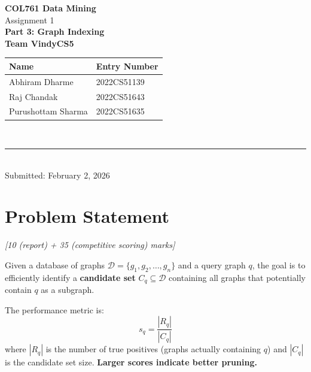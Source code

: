 \documentclass[12pt,a4paper]{article}
\begin{document}
\begin{titlepage}
    \centering
    \vspace*{1cm}
    {\Huge\bfseries\color{indigoblue} COL761 Data Mining}\\[0.5cm]
    {\LARGE Assignment 1}\\[0.3cm]
    {\Large\textbf{Part 3: Graph Indexing}}\\[2cm]
    
    {\LARGE\bfseries Team VindyCS5}\\[0.5cm]
    
    \begin{tabular}{ll}
        \toprule
        \textbf{Name} & \textbf{Entry Number} \\
        \midrule
        Abhiram Dharme & 2022CS51139 \\
        Raj Chandak & 2022CS51643 \\
        Purushottam Sharma & 2022CS51635 \\
        \bottomrule
    \end{tabular}\\[1cm]
    
    \rule{\textwidth}{0.5pt}\\[0.3cm]
    {\large Submitted: February 2, 2026}
    \vfill
\end{titlepage}

\tableofcontents
\newpage

\section{Problem Statement}
\textit{[10 (report) + 35 (competitive scoring) marks]}

Given a database of graphs $\mathcal{D} = \{g_1, g_2, \ldots, g_n\}$ and a query graph $q$, the goal is to efficiently identify a \textbf{candidate set} $C_q \subseteq \mathcal{D}$ containing all graphs that potentially contain $q$ as a subgraph.

The performance metric is:
\[
s_q = \frac{|R_q|}{|C_q|}
\]
where $|R_q|$ is the number of true positives (graphs actually containing $q$) and $|C_q|$ is the candidate set size. \textbf{Larger scores indicate better pruning.}
\end{document}
